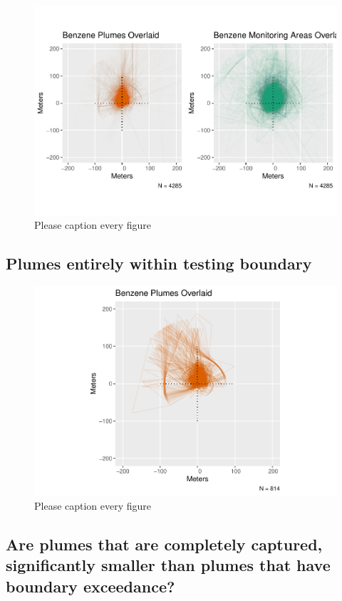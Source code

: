 \documentclass[draft,linenumbers]{agujournal2018}
\begin{document}
\begin{figure}[h]
\includegraphics{CA_Benzene_Plumes_files/figure-latex/AllplumeAreas-1} \caption{Please caption every figure}\label{fig:AllplumeAreas}
\end{figure}

\subsection{Plumes entirely within testing boundary}

\begin{figure}[h]
\includegraphics{CA_Benzene_Plumes_files/figure-latex/plumesinBoundary-1} \caption{Please caption every figure}\label{fig:plumesinBoundary}
\end{figure}

\subsection{Are plumes that are completely captured, significantly
smaller than plumes that have boundary exceedance?}
\end{document}
